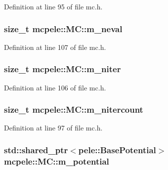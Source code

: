 \-Definition at line 95 of file mc.\-h.

\hypertarget{classmcpele_1_1MC_a678adb43213ef8da3a8b7620a8ff4d6e}{
\subsubsection[{m\-\_\-neval}]{\setlength{\rightskip}{0pt plus 5cm}size\-\_\-t {\bf mcpele\-::\-M\-C\-::m\-\_\-neval}}}\label{classmcpele_1_1MC_a678adb43213ef8da3a8b7620a8ff4d6e}


\-Definition at line 107 of file mc.\-h.

\hypertarget{classmcpele_1_1MC_a570b47c5f340c2afda0a519f1225eba9}{
\subsubsection[{m\-\_\-niter}]{\setlength{\rightskip}{0pt plus 5cm}size\-\_\-t {\bf mcpele\-::\-M\-C\-::m\-\_\-niter}}}\label{classmcpele_1_1MC_a570b47c5f340c2afda0a519f1225eba9}


\-Definition at line 106 of file mc.\-h.

\hypertarget{classmcpele_1_1MC_a1aac8aa817cf8eecd16eb414717b9205}{
\subsubsection[{m\-\_\-nitercount}]{\setlength{\rightskip}{0pt plus 5cm}size\-\_\-t {\bf mcpele\-::\-M\-C\-::m\-\_\-nitercount}}}\label{classmcpele_1_1MC_a1aac8aa817cf8eecd16eb414717b9205}


\-Definition at line 97 of file mc.\-h.

\hypertarget{classmcpele_1_1MC_a80e94b003bfc9893c1f829064125a81c}{
\subsubsection[{m\-\_\-potential}]{\setlength{\rightskip}{0pt plus 5cm}std\-::shared\-\_\-ptr$<$pele\-::\-Base\-Potential$>$ {\bf mcpele\-::\-M\-C\-::m\-\_\-potential}}}\label{classmcpele_1_1MC_a80e94b003bfc9893c1f829064125a81c}


